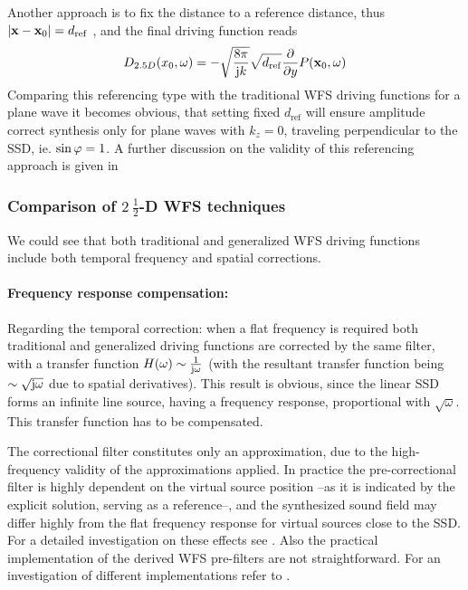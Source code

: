 Another approach is to fix the distance to a reference distance, thus $|\mathbf{x} - \mathbf{x}_0| = d_{\mathrm{ref}}$ \cite{Ahrens2012, Ahrens2010phd}, and the final driving function reads
\begin{equation}
D_{2.5D}(x_0,\omega) =  -\sqrt{\frac{8\pi}{\mathrm{j} k}}\sqrt{d_{\mathrm{ref}}} \frac{\partial}{\partial y} P(\mathbf{x}_0,\omega)
\label{Eq:Theory:WFS_Ahrens_driv_fun}
\end{equation}
Comparing this referencing type with the traditional WFS driving functions for a plane wave it becomes obvious, that setting fixed $d_{\mathrm{ref}}$ will ensure amplitude correct synthesis only for plane waves with $k_z = 0$, traveling perpendicular to the SSD, ie. $\sin\varphi = 1$. A further discussion on the validity of this referencing approach is given in \cite[Sect.~3.9.4]{Ahrens2012}

\subsubsection{Comparison of $2~\frac{1}{2}$-D WFS techniques}
We could see that both traditional and generalized WFS driving functions include both temporal frequency and spatial corrections.

\vspace{3mm}
\paragraph{Frequency response compensation:}
Regarding the temporal correction: when a flat frequency is required both traditional and generalized driving functions are corrected by the same filter, with a transfer function $H(\omega) \sim \frac{1}{\mathrm{j} \omega}$ (with the resultant transfer function being $\sim \sqrt{\mathrm{j} \omega}$ due to spatial derivatives). This result is obvious, since the linear SSD forms an infinite line source, having a frequency response, proportional with $\sqrt{\omega}$. This transfer function has to be compensated. 

The correctional filter constitutes only an approximation, due to the high-frequency validity of the approximations applied. In practice the pre-correctional filter is highly dependent on the virtual source position --as it is indicated by the explicit solution, serving as a reference--, and the synthesized sound field may differ highly from the flat frequency response for virtual sources close to the SSD. For a detailed investigation on these effects see \cite{Spors10ahrens:analysis}. Also the practical implementation of the derived WFS pre-filters are not straightforward. For an investigation of different implementations refer to \cite{Schultz2013:IIR_prefilters}. 

